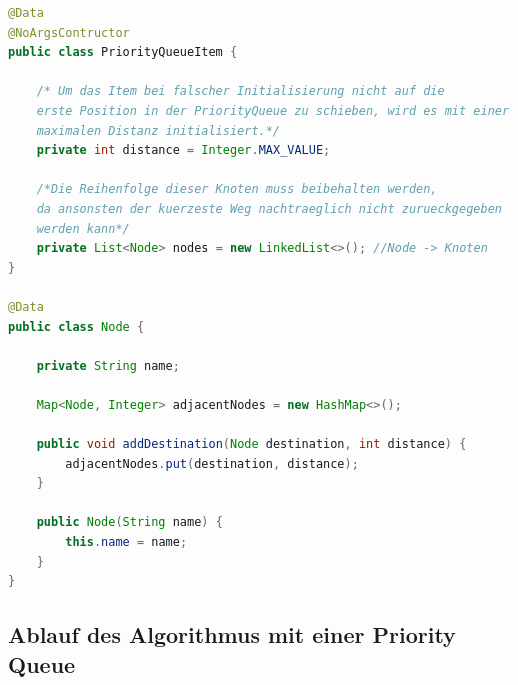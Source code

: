 \documentclass[a4paper]{article}
\begin{document}
\begin{lstlisting}[language = java, frame = trBL]
@Data
@NoArgsContructor
public class PriorityQueueItem {

    /* Um das Item bei falscher Initialisierung nicht auf die
    erste Position in der PriorityQueue zu schieben, wird es mit einer
    maximalen Distanz initialisiert.*/
    private int distance = Integer.MAX_VALUE; 

    /*Die Reihenfolge dieser Knoten muss beibehalten werden,
    da ansonsten der kuerzeste Weg nachtraeglich nicht zurueckgegeben
    werden kann*/
    private List<Node> nodes = new LinkedList<>(); //Node -> Knoten
}

@Data
public class Node {
    
    private String name;
    
    Map<Node, Integer> adjacentNodes = new HashMap<>();

    public void addDestination(Node destination, int distance) {
        adjacentNodes.put(destination, distance);
    }
 
    public Node(String name) {
        this.name = name;
    }
}
\end{lstlisting}

\newpage
\subsection{Ablauf des Algorithmus mit einer Priority Queue}
\end{document}

